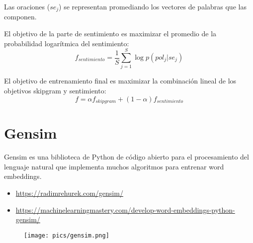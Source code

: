 Las oraciones ($se_j$) se representan promediando los vectores de palabras que las componen.

El objetivo de la parte de sentimiento es maximizar el promedio de la probabilidad logarítmica del sentimiento:
\begin{displaymath}
f_{sentimiento}= \frac{1}{S}\sum_{j=1}^{S}\log p(pol_j|se_j)
\end{displaymath}

El objetivo de entrenamiento final es maximizar la combinación lineal de los objetivos skipgram y sentimiento:
\begin{displaymath}
f = \alpha f_{skipgram} + (1- \alpha)f_{sentimiento}
\end{displaymath}

\section{Gensim}
Gensim es una biblioteca de Python de código abierto para el procesamiento del lenguaje natural que implementa muchos algoritmos para entrenar word embeddings.

\begin{itemize}
 \item \url{https://radimrehurek.com/gensim/}
  \item \url{https://machinelearningmastery.com/develop-word-embeddings-python-gensim/}
\end{itemize}

\begin{figure}[h]
	\centering
	\texttt{[image: pics/gensim.png]}
\end{figure}

